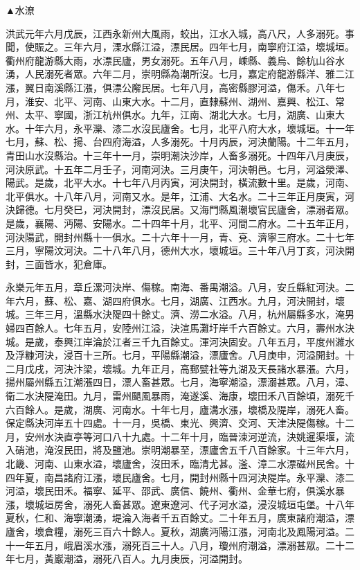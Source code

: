 \begin{pinyinscope}
▲水潦

洪武元年六月戊辰，江西永新州大風雨，蛟出，江水入城，高八尺，人多溺死。事聞，使賑之。三年六月，溧水縣江溢，漂民居。四年七月，南寧府江溢，壞城垣。衢州府龍游縣大雨，水漂民廬，男女溺死。五年八月，嵊縣、義烏、餘杭山谷水湧，人民溺死者眾。六年二月，崇明縣為潮所沒。七月，嘉定府龍游縣洋、雅二江漲，翼日南溪縣江漲，俱漂公廨民居。七年八月，高密縣膠河溢，傷禾。八年七月，淮安、北平、河南、山東大水。十二月，直隸蘇州、湖州、嘉興、松江、常州、太平、寧國，浙江杭州俱水。九年，江南、湖北大水。七月，湖廣、山東大水。十年六月，永平灤、漆二水沒民廬舍。七月，北平八府大水，壞城垣。十一年七月，蘇、松、揚、台四府海溢，人多溺死。十月丙辰，河決蘭陽。十二年五月，青田山水沒縣治。十三年十一月，崇明潮決沙岸，人畜多溺死。十四年八月庚辰，河決原武。十五年二月壬子，河南河決。三月庚午，河決朝邑。七月，河溢滎澤、陽武。是歲，北平大水。十七年八月丙寅，河決開封，橫流數十里。是歲，河南、北平俱水。十八年八月，河南又水。是年，江浦、大名水。二十三年正月庚寅，河決歸德。七月癸巳，河決開封，漂沒民居。又海門縣風潮壞官民廬舍，漂溺者眾。是歲，襄陽、沔陽、安陽水。二十四年十月，北平、河間二府水。二十五年正月，河決陽武，開封州縣十一俱水。二十六年十一月，青、兗、濟寧三府水。二十七年三月，寧陽汶河決。二十八年八月，德州大水，壞城垣。三十年八月丁亥，河決開封，三面皆水，犯倉庫。

永樂元年五月，章丘漯河決岸、傷稼。南海、番禺潮溢。八月，安丘縣紅河決。二年六月，蘇、松、嘉、湖四府俱水。七月，湖廣、江西水。九月，河決開封，壞城。三年三月，溫縣水決隄四十餘丈。濟、澇二水溢。八月，杭州屬縣多水，淹男婦四百餘人。七年五月，安陸州江溢，決渲馬灘圩岸千六百餘丈。六月，壽州水決城。是歲，泰興江岸淪於江者三千九百餘丈。渾河決固安。八年五月，平度州濰水及浮糠河決，浸百十三所。七月，平陽縣潮溢，漂廬舍。八月庚申，河溢開封。十二月戊戌，河決汴梁，壞城。九年正月，高郵甓社等九湖及天長諸水暴漲。六月，揚州屬州縣五江潮漲四日，漂人畜甚眾。七月，海寧潮溢，漂溺甚眾。八月，漳、衛二水決隄淹田。九月，雷州颶風暴雨，淹遂溪、海康，壞田禾八百餘頃，溺死千六百餘人。是歲，湖廣、河南水。十年七月，廬溝水漲，壞橋及隄岸，溺死人畜。保定縣決河岸五十四處。十一月，吳橋、東光、興濟、交河、天津決隄傷稼。十二月，安州水決直亭等河口八十九處。十二年十月，臨晉涑河逆流，決姚暹渠堰，流入硝池，淹沒民田，將及鹽池。崇明潮暴至，漂廬舍五千八百餘家。十三年六月，北畿、河南、山東水溢，壞廬舍，沒田禾，臨清尤甚。滏、漳二水漂磁州民舍。十四年夏，南昌諸府江漲，壞民廬舍。七月，開封州縣十四河決隄岸。永平灤、漆二河溢，壞民田禾。福寧、延平、邵武、廣信、饒州、衢州、金華七府，俱溪水暴漲，壞城垣房舍，溺死人畜甚眾。遼東遼河、代子河水溢，浸沒城垣屯堡。十八年夏秋，仁和、海寧潮湧，堤淪入海者千五百餘丈。二十年五月，廣東諸府潮溢，漂廬舍，壞倉糧，溺死三百六十餘人。夏秋，湖廣沔陽江漲，河南北及鳳陽河溢。二十一年五月，峨眉溪水漲，溺死百三十人。八月，瓊州府潮溢，漂溺甚眾。二十二年七月，黃巖潮溢，溺死八百人。九月庚辰，河溢開封。


\end{pinyinscope}
